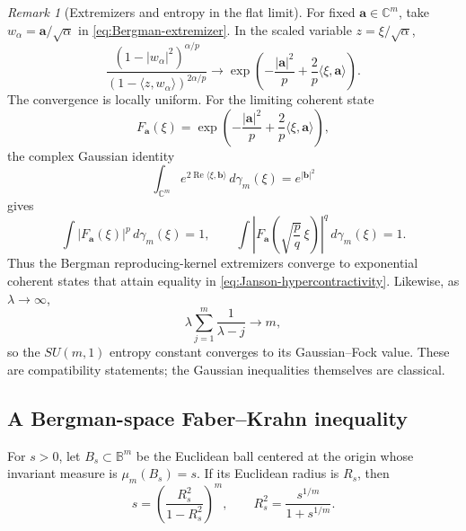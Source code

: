 \documentclass[11pt,reqno]{amsart}
\numberwithin{equation}{section}
\theoremstyle{definition}
\theoremstyle{remark}
\newtheorem{remark}[theorem]{Remark}
\begin{document}
\begin{remark}[Extremizers and entropy in the flat limit]
For fixed \(\mathbf a\in\mathbb C^m\), take
\(w_\alpha=\mathbf a/\sqrt{\alpha}\) in
\eqref{eq:Bergman-extremizer}.  In the scaled variable
\(z=\xi/\sqrt{\alpha}\),
\[
 \frac{(1-|w_\alpha|^2)^{\alpha/p}}{(1-\langle z,w_\alpha\rangle)^{2\alpha/p}}
 \longrightarrow
 \exp\left(
 -\frac{|\mathbf a|^2}{p}
 +\frac{2}{p}\langle\xi,\mathbf a\rangle
 \right).
\]
The convergence is locally uniform.  For the limiting coherent state
\[
 F_{\mathbf a}(\xi)
 =
 \exp\left(
 -\frac{|\mathbf a|^2}{p}
 +\frac{2}{p}\langle\xi,\mathbf a\rangle
 \right),
\]
the complex Gaussian identity
\[
 \int_{\mathbb C^m}
 e^{2\operatorname{Re}\langle\xi,\mathbf b\rangle}\,d\gamma_m(\xi)
 =
 e^{|\mathbf b|^2}
\]
gives
\[
 \int|F_{\mathbf a}(\xi)|^p\,d\gamma_m(\xi)=1,
 \qquad
 \int\left|F_{\mathbf a}\!\left(\sqrt{\frac{p}q}\,\xi\right)\right|^q
 \,d\gamma_m(\xi)=1.
\]
Thus the Bergman reproducing-kernel extremizers converge to exponential
coherent states that attain equality in
\eqref{eq:Janson-hypercontractivity}.  Likewise, as
\(\lambda\to\infty\),
\[
 \lambda\sum_{j=1}^m\frac{1}{\lambda-j}\longrightarrow m,
\]
so the \(SU(m,1)\) entropy constant converges to its Gaussian--Fock value.
These are compatibility statements; the Gaussian inequalities themselves
are classical.
\end{remark}

\subsection{A Bergman-space Faber--Krahn inequality}

For $s>0$, let $B_s\subset\mathbb B^m$ be the Euclidean ball centered at the
origin whose invariant measure is $\mu_m(B_s)=s$.  If its Euclidean radius
is $R_s$, then
\begin{equation}
 s=\left(\frac{R_s^2}{1-R_s^2}\right)^m,
 \qquad
 R_s^2=\frac{s^{1/m}}{1+s^{1/m}}.
 \label{eq:invariant-ball-radius}
\end{equation}
\end{document}
